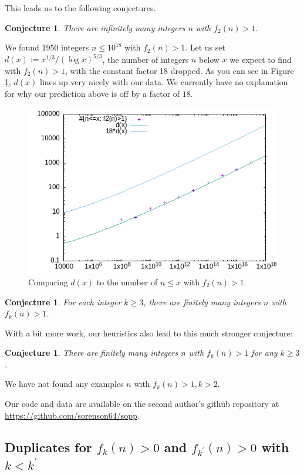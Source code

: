 \documentclass[11pt]{amsart}
\newtheorem{conjecture}[thm]{Conjecture}
\numberwithin{equation}{section}
\numberwithin{algorithm}{section}
\begin{document}
This leads us to the following conjectures.
\begin{conjecture}
    There are infinitely many integers $n$
    with $f_2(n)>1$.
\end{conjecture}
We found 1950 integers $n\le 10^{18}$ with $f_2(n)>1$.
Let us set $d(x):=x^{1/3}/(\log x)^{5/3}$, the number of integers $n$ below $x$
we expect to find with $f_2(n)>1$,
with the constant factor 18 dropped.
As you can see in Figure \ref{fig:dups}, $d(x)$ lines up very nicely with our data.
We currently have no explanation for why our prediction above is off by a factor
of $18$.
\begin{figure}
\caption{Comparing $d(x)$ to the number of $n\le x$ with $f_2(n)>1$.}
\label{fig:dups}
    \includegraphics[width=\textwidth]{dupsplot.png}
\end{figure}

\begin{conjecture}
  For each integer $k\ge 3$,
    there are finitely many integers $n$
    with $f_k(n)>1$.
\end{conjecture}
With a bit more work, our heuristics also lead to this
much stronger conjecture:
\begin{conjecture}
    There are finitely many integers $n$
    with $f_k(n)>1$ for \textit{any} $k\ge 3$.
\end{conjecture}
We have not found any examples $n$ with $f_k(n)>1, k>2$.

Our code and data are available on the second author's github repository
at \url{https://github.com/sorenson64/sopp}.



\subsection{Duplicates for $f_k(n)>0$ and $f_{k^\prime}(n)>0$ with $k< k^\prime$}
\end{document}
